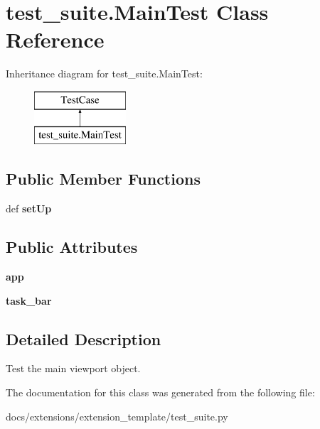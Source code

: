 \hypertarget{classtest__suite_1_1MainTest}{\section{test\-\_\-suite.\-Main\-Test Class Reference}
\label{classtest__suite_1_1MainTest}
}
Inheritance diagram for test\-\_\-suite.\-Main\-Test\-:\begin{figure}[H]
\begin{center}
\leavevmode
\includegraphics[height=2.000000cm]{classtest__suite_1_1MainTest}
\end{center}
\end{figure}
\subsection*{Public Member Functions}
\begin{DoxyCompactItemize}
\item 
\hypertarget{classtest__suite_1_1MainTest_a57bb1945a0545f0fa500dcc90c169582}{def {\bfseries set\-Up}}\label{classtest__suite_1_1MainTest_a57bb1945a0545f0fa500dcc90c169582}

\end{DoxyCompactItemize}
\subsection*{Public Attributes}
\begin{DoxyCompactItemize}
\item 
\hypertarget{classtest__suite_1_1MainTest_a2b8604f658425b346560313e53b5043e}{{\bfseries app}}\label{classtest__suite_1_1MainTest_a2b8604f658425b346560313e53b5043e}

\item 
\hypertarget{classtest__suite_1_1MainTest_a5507ff6888c48491ca3b1c97fb7bd505}{{\bfseries task\-\_\-bar}}\label{classtest__suite_1_1MainTest_a5507ff6888c48491ca3b1c97fb7bd505}

\end{DoxyCompactItemize}


\subsection{Detailed Description}
\begin{DoxyVerb}Test the main viewport object.
\end{DoxyVerb}
 

The documentation for this class was generated from the following file\-:\begin{DoxyCompactItemize}
\item 
docs/extensions/extension\-\_\-template/test\-\_\-suite.\-py\end{DoxyCompactItemize}
